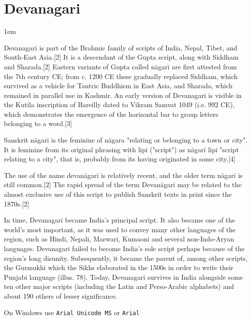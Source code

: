 \section{Devanagari}
\parindent1em

Devanagari is part of the Brahmic family of scripts of India, Nepal, Tibet, and South-East Asia.[2] It is a descendant of the Gupta script, along with Siddham and Sharada.[2] Eastern variants of Gupta called nāgarī are first attested from the 7th century CE; from c. 1200 CE these gradually replaced Siddham, which survived as a vehicle for Tantric Buddhism in East Asia, and Sharada, which remained in parallel use in Kashmir. An early version of Devanagari is visible in the Kutila inscription of Bareilly dated to Vikram Samvat 1049 (i.e. 992 CE), which demonstrates the emergence of the horizontal bar to group letters belonging to a word.[3]

Sanskrit nāgarī is the feminine of nāgara "relating or belonging to a town or city". It is feminine from its original phrasing with lipi ("script") as nāgarī lipi "script relating to a city", that is, probably from its having originated in some city.[4]

The use of the name devanāgarī is relatively recent, and the older term nāgarī is still common.[2] The rapid spread of the term Devanāgarī may be related to the almost exclusive use of this script to publish Sanskrit texts in print since the 1870s.[2]

In time, Devanagari became India’s principal script. It also
became one of the world’s most important, as it was used to
convey many other languages of the region, such as Hindi, Nepali, Marwari, 
Kumaoni and several non-Indo-Aryan
languages. Devanagari failed to become India’s sole script perhaps
because of the region’s long disunity. Subsequently, it
became the parent of, among other scripts, the Gurmukhi
which the Sikhs elaborated in the 1500s in order to write their
Punjabi language (illus. 78). Today, Devanagari survives in India
alongside some ten other major scripts (including the Latin and
Perso-Arabic alphabets) and about 190 others of lesser significance.\cite{writing}

On Windows use \texttt{Arial Unicode MS} or \texttt{Arial}
\medskip

\newfontfamily{}
\let\devanagari\devanagarilohit

